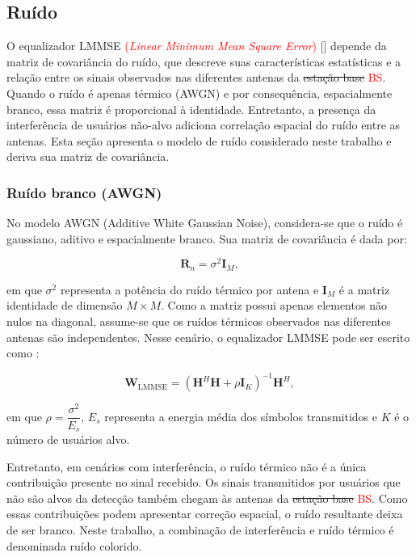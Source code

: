 \providecommand{\destaque}[2]{{\setlength{\fboxsep}{1.5pt}\colorbox{#1}{$#2$}}}
\subsection{Ruído}\label{subsec:ruido-colorido}
O equalizador LMMSE \textcolor{red}{(\textit{Linear Minimum Mean Square Error}) \cite{zhao2025jsac}} [] depende da matriz de covariância do ruído, que descreve suas características estatísticas e a relação entre os sinais observados nas diferentes antenas da \sout{estação base} \textcolor{red}{BS}. Quando o ruído é apenas térmico (AWGN) e por consequência, espacialmente branco, essa matriz é proporcional à identidade. Entretanto, a presença da interferência de usuários não-alvo adiciona correlação espacial do ruído entre as antenas. Esta seção apresenta o modelo de ruído considerado neste trabalho e deriva sua matriz de covariância.

\subsubsection{Ruído branco (AWGN)}
No modelo AWGN (Additive White Gaussian Noise), considera-se que o ruído é gaussiano, aditivo e espacialmente branco. Sua matriz de covariância é dada por:

\[
\mathbf R_n=\sigma^2\mathbf I_M,
\]

em que $\sigma^2$ representa a potência do ruído térmico por antena e $\mathbf I_M$ é a matriz identidade de dimensão $M\times M$. Como a matriz possui apenas elementos não nulos na diagonal, assume-se que os ruídos térmicos observados nas diferentes antenas são independentes. Nesse cenário, o equalizador LMMSE pode ser escrito como \cite{jeon2019}:

\[
\mathbf W_{\mathrm{LMMSE}}=
\left(
\mathbf H^H\mathbf H+
\rho\mathbf I_K
\right)^{-1}\mathbf H^H,
\]

em que  $\rho =  \dfrac{\sigma^2}{E_s}$, $E_s$ representa a energia média dos símbolos transmitidos e $K$ é o número de usuários alvo.

Entretanto, em cenários com interferência, o ruído térmico não é a única contribuição presente no sinal recebido. Os sinais transmitidos por usuários que não são alvos da detecção também chegam às antenas da \sout{estação base} \textcolor{red}{BS}. Como essas contribuições podem apresentar correção espacial, o ruído resultante deixa de ser branco. Neste trabalho, a combinação de interferência e ruído térmico é denominada ruído colorido.


